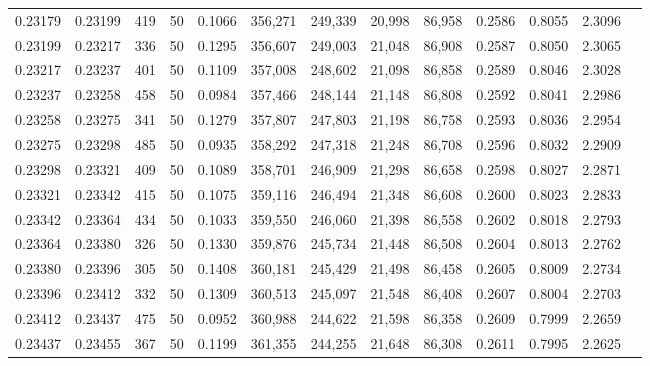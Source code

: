 \begin{tabular}{rrrrrrrrrrrrr}
0.23179 & 0.23199 &   419 &  50 &                                     0.1066 & 356,271 & 249,339 &  20,998 &  86,958 & 0.2586 & 0.8055 & 2.3096 \\
0.23199 & 0.23217 &   336 &  50 &                                     0.1295 & 356,607 & 249,003 &  21,048 &  86,908 & 0.2587 & 0.8050 & 2.3065 \\
0.23217 & 0.23237 &   401 &  50 &                                     0.1109 & 357,008 & 248,602 &  21,098 &  86,858 & 0.2589 & 0.8046 & 2.3028 \\
0.23237 & 0.23258 &   458 &  50 &                                     0.0984 & 357,466 & 248,144 &  21,148 &  86,808 & 0.2592 & 0.8041 & 2.2986 \\
0.23258 & 0.23275 &   341 &  50 &                                     0.1279 & 357,807 & 247,803 &  21,198 &  86,758 & 0.2593 & 0.8036 & 2.2954 \\
0.23275 & 0.23298 &   485 &  50 &                                     0.0935 & 358,292 & 247,318 &  21,248 &  86,708 & 0.2596 & 0.8032 & 2.2909 \\
0.23298 & 0.23321 &   409 &  50 &                                     0.1089 & 358,701 & 246,909 &  21,298 &  86,658 & 0.2598 & 0.8027 & 2.2871 \\
0.23321 & 0.23342 &   415 &  50 &                                     0.1075 & 359,116 & 246,494 &  21,348 &  86,608 & 0.2600 & 0.8023 & 2.2833 \\
0.23342 & 0.23364 &   434 &  50 &                                     0.1033 & 359,550 & 246,060 &  21,398 &  86,558 & 0.2602 & 0.8018 & 2.2793 \\
0.23364 & 0.23380 &   326 &  50 &                                     0.1330 & 359,876 & 245,734 &  21,448 &  86,508 & 0.2604 & 0.8013 & 2.2762 \\
0.23380 & 0.23396 &   305 &  50 &                                     0.1408 & 360,181 & 245,429 &  21,498 &  86,458 & 0.2605 & 0.8009 & 2.2734 \\
0.23396 & 0.23412 &   332 &  50 &                                     0.1309 & 360,513 & 245,097 &  21,548 &  86,408 & 0.2607 & 0.8004 & 2.2703 \\
0.23412 & 0.23437 &   475 &  50 &                                     0.0952 & 360,988 & 244,622 &  21,598 &  86,358 & 0.2609 & 0.7999 & 2.2659 \\
0.23437 & 0.23455 &   367 &  50 &                                     0.1199 & 361,355 & 244,255 &  21,648 &  86,308 & 0.2611 & 0.7995 & 2.2625 \\

\end{tabular}
